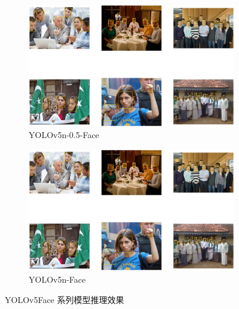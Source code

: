 \documentclass{article}
\begin{document}
\begin{figure}[htbp]
    \centering
    \begin{subfigure}[b]{0.48\textwidth}
        \includegraphics[width=\textwidth]{imgs/infer_result/yolov5n_0.5_face.jpg}
        \caption{YOLOv5n-0.5-Face}
    \end{subfigure}
    \hfill
    \begin{subfigure}[b]{0.48\textwidth}
        \includegraphics[width=\textwidth]{imgs/infer_result/yolov5n_face.jpg}
        \caption{YOLOv5n-Face}
    \end{subfigure}
    \caption{YOLOv5Face 系列模型推理效果}
    \label{fig:infer_yolov5face}
\end{figure}
\end{document}
